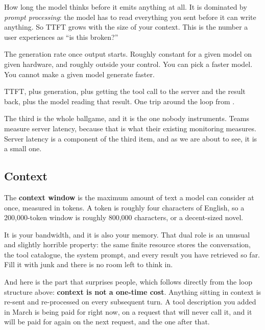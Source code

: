 \begin{description}[leftmargin=1.4em, style=nextline, itemsep=5pt]

\item[Time to first token, or TTFT] How long the model thinks before it emits
anything at all. It is dominated by \emph{prompt processing}: the model has to
read everything you sent before it can write anything. So TTFT grows with the
size of your context. This is the number a user experiences as ``is this
broken?''

\item[Tokens per second] The generation rate once output starts. Roughly
constant for a given model on given hardware, and roughly outside your control.
You can pick a faster model. You cannot make a given model generate faster.

\item[Round-trip time of one loop iteration] TTFT, plus generation, plus getting
the tool call to the server and the result back, plus the model reading that
result. One trip around the loop from .

\end{description}

The third is the whole ballgame, and it is the one nobody instruments. Teams
measure server latency, because that is what their existing monitoring measures.
Server latency is a component of the third item, and as we are about to see, it
is a small one.

\subsection{Context}

The \textbf{context window} is the maximum amount of text a model can consider
at once, measured in tokens. A token is roughly four characters of English, so a
200,000-token window is roughly 800,000 characters, or a decent-sized novel.

It is your bandwidth, and it is also your memory. That dual role is an unusual
and slightly horrible property: the same finite resource stores the conversation, the tool
catalogue, the system prompt, and every result you have retrieved so far. Fill
it with junk and there is no room left to think in.

And here is the part that surprises people, which follows directly from the loop
structure above: \textbf{context is not a one-time cost}. Anything sitting in
context is re-sent and re-processed on every subsequent turn. A tool description
you added in March is being paid for right now, on a request that will never
call it, and it will be paid for again on the next request, and the one after
that.

